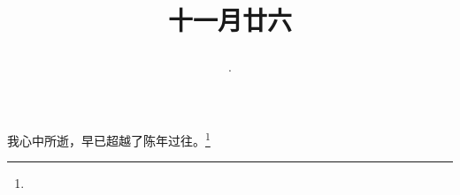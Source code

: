 \title{\date[d=26,m=12,y=2024][year:cn-y,年,month:cn,day:cn,日,·,weekday]·十一月廿六 }
我心中所逝，早已超越了陈年过往。\footnote{ }

